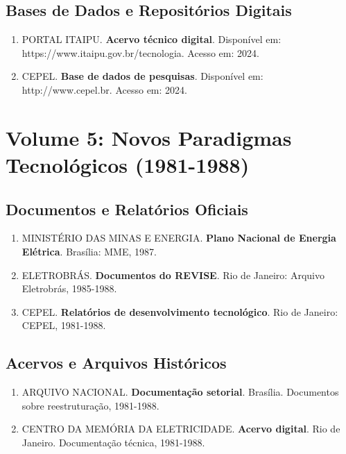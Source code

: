 \documentclass[12pt,a4paper]{report}
\begin{document}
\section*{Bases de Dados e Repositórios Digitais}
\begin{enumerate}[leftmargin=*]
    \item PORTAL ITAIPU. \textbf{Acervo técnico digital}. Disponível em: https://www.itaipu.gov.br/tecnologia. Acesso em: 2024.
    
    \item CEPEL. \textbf{Base de dados de pesquisas}. Disponível em: http://www.cepel.br. Acesso em: 2024.
\end{enumerate}

\chapter*{Volume 5: Novos Paradigmas Tecnológicos (1981-1988)}

\section*{Documentos e Relatórios Oficiais}
\begin{enumerate}[leftmargin=*]
    \item MINISTÉRIO DAS MINAS E ENERGIA. \textbf{Plano Nacional de Energia Elétrica}. Brasília: MME, 1987.
    
    \item ELETROBRÁS. \textbf{Documentos do REVISE}. Rio de Janeiro: Arquivo Eletrobrás, 1985-1988.
    
    \item CEPEL. \textbf{Relatórios de desenvolvimento tecnológico}. Rio de Janeiro: CEPEL, 1981-1988.
\end{enumerate}

\section*{Acervos e Arquivos Históricos}
\begin{enumerate}[leftmargin=*]
    \item ARQUIVO NACIONAL. \textbf{Documentação setorial}. Brasília. Documentos sobre reestruturação, 1981-1988.
    
    \item CENTRO DA MEMÓRIA DA ELETRICIDADE. \textbf{Acervo digital}. Rio de Janeiro. Documentação técnica, 1981-1988.
\end{enumerate}
\end{document}
